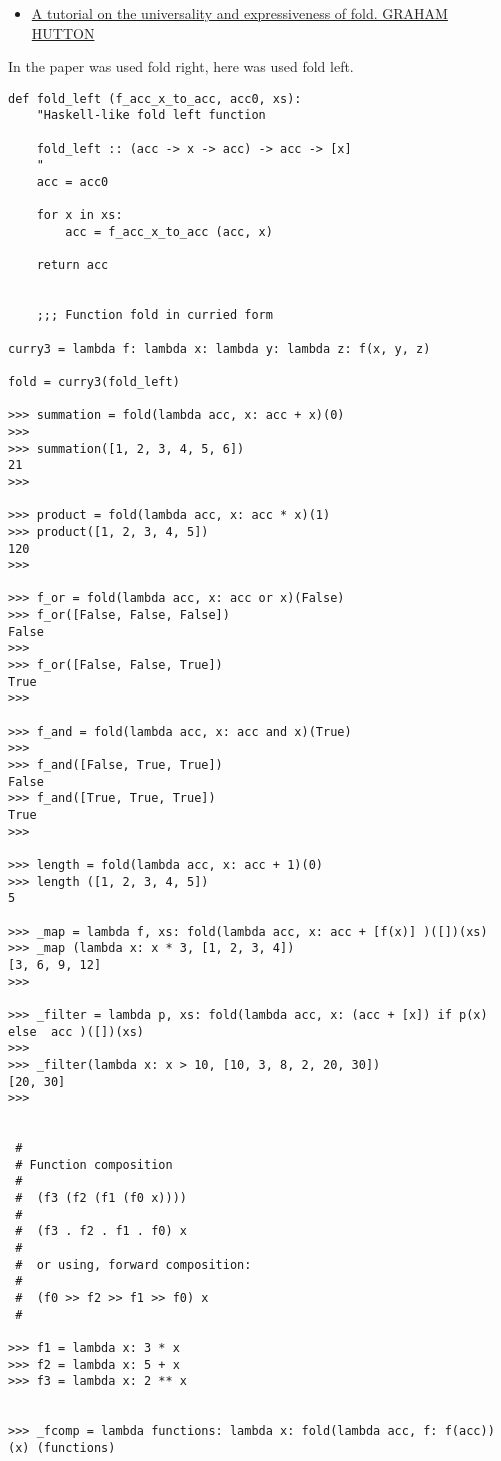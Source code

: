 \documentclass[11pt]{article}
\begin{document}
\begin{enumerate}
\begin{itemize}
\item \href{http://www.cs.nott.ac.uk/~pszgmh/fold.pdf}{A tutorial on the universality and expressiveness of fold. GRAHAM HUTTON}
\end{itemize}

In the paper was used fold right, here was used fold left. 

\begin{verbatim}
def fold_left (f_acc_x_to_acc, acc0, xs):
    "Haskell-like fold left function
    
    fold_left :: (acc -> x -> acc) -> acc -> [x]
    "
    acc = acc0
    
    for x in xs:
        acc = f_acc_x_to_acc (acc, x)
        
    return acc
    
    
    ;;; Function fold in curried form 
    
curry3 = lambda f: lambda x: lambda y: lambda z: f(x, y, z)

fold = curry3(fold_left)

>>> summation = fold(lambda acc, x: acc + x)(0)
>>> 
>>> summation([1, 2, 3, 4, 5, 6])
21
>>> 

>>> product = fold(lambda acc, x: acc * x)(1)
>>> product([1, 2, 3, 4, 5])
120
>>> 

>>> f_or = fold(lambda acc, x: acc or x)(False)
>>> f_or([False, False, False])
False
>>> 
>>> f_or([False, False, True])
True
>>> 

>>> f_and = fold(lambda acc, x: acc and x)(True)
>>> 
>>> f_and([False, True, True])
False
>>> f_and([True, True, True])
True
>>> 

>>> length = fold(lambda acc, x: acc + 1)(0)
>>> length ([1, 2, 3, 4, 5])
5

>>> _map = lambda f, xs: fold(lambda acc, x: acc + [f(x)] )([])(xs)
>>> _map (lambda x: x * 3, [1, 2, 3, 4])
[3, 6, 9, 12]
>>> 

>>> _filter = lambda p, xs: fold(lambda acc, x: (acc + [x]) if p(x) else  acc )([])(xs)
>>> 
>>> _filter(lambda x: x > 10, [10, 3, 8, 2, 20, 30])
[20, 30]
>>> 


 #
 # Function composition
 # 
 #  (f3 (f2 (f1 (f0 x))))
 #
 #  (f3 . f2 . f1 . f0) x
 #
 #  or using, forward composition:
 # 
 #  (f0 >> f2 >> f1 >> f0) x
 #
 
>>> f1 = lambda x: 3 * x
>>> f2 = lambda x: 5 + x
>>> f3 = lambda x: 2 ** x


>>> _fcomp = lambda functions: lambda x: fold(lambda acc, f: f(acc)) (x) (functions)


\end{verbatim}
\end{enumerate}
\end{document}
